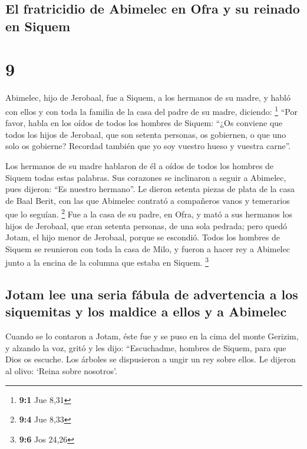 \hypertarget{el-fratricidio-de-abimelec-en-ofra-y-su-reinado-en-siquem}{%
\subsection{El fratricidio de Abimelec en Ofra y su reinado en
Siquem}\label{el-fratricidio-de-abimelec-en-ofra-y-su-reinado-en-siquem}}

\hypertarget{section-8}{%
\section{9}\label{section-8}}

 Abimelec, hijo de Jerobaal, fue a Siquem, a los hermanos
de su madre, y habló con ellos y con toda la familia de la casa del
padre de su madre, diciendo: \footnote{\textbf{9:1} Jue 8,31}
 ``Por favor, habla en los oídos de todos los hombres de
Siquem: ``¿Os conviene que todos los hijos de Jerobaal, que son setenta
personas, os gobiernen, o que uno solo os gobierne? Recordad también que
yo soy vuestro hueso y vuestra carne''.

 Los hermanos de su madre hablaron de él a oídos de todos
los hombres de Siquem todas estas palabras. Sus corazones se inclinaron
a seguir a Abimelec, pues dijeron: ``Es nuestro hermano''.
 Le dieron setenta piezas de plata de la casa de Baal
Berit, con las que Abimelec contrató a compañeros vanos y temerarios que
lo seguían. \footnote{\textbf{9:4} Jue 8,33}  Fue a la
casa de su padre, en Ofra, y mató a sus hermanos los hijos de Jerobaal,
que eran setenta personas, de una sola pedrada; pero quedó Jotam, el
hijo menor de Jerobaal, porque se escondió.  Todos los
hombres de Siquem se reunieron con toda la casa de Milo, y fueron a
hacer rey a Abimelec junto a la encina de la columna que estaba en
Siquem. \footnote{\textbf{9:6} Jos 24,26}

\hypertarget{jotam-lee-una-seria-fuxe1bula-de-advertencia-a-los-siquemitas-y-los-maldice-a-ellos-y-a-abimelec}{%
\subsection{Jotam lee una seria fábula de advertencia a los siquemitas y
los maldice a ellos y a
Abimelec}\label{jotam-lee-una-seria-fuxe1bula-de-advertencia-a-los-siquemitas-y-los-maldice-a-ellos-y-a-abimelec}}

 Cuando se lo contaron a Jotam, éste fue y se puso en la
cima del monte Gerizim, y alzando la voz, gritó y les dijo:
``Escuchadme, hombres de Siquem, para que Dios os escuche.
 Los árboles se dispusieron a ungir un rey sobre ellos. Le
dijeron al olivo: `Reina sobre nosotros'.

